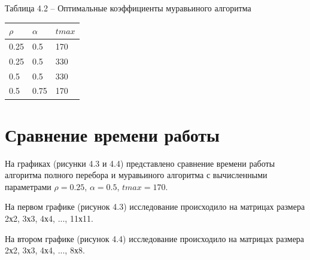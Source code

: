 \documentclass[12pt]{report}
\begin{document}
\begin{center}
	Таблица 4.2 -- Оптимальные коэффициенты муравьиного алгоритма
\end{center}

\begin{center}
	\begin{table}[h!]
		\begin{center}
			\begin{tabular}{|l|l|l|}
				\hline
				$\rho$                        & $\alpha$ & $tmax$ \\ \hline
				\multicolumn{1}{|c|}{0.25} & 0.5   & 170  \\ \hline
				0.25                       & 0.5   & 330  \\ \hline
				0.5                        & 0.5   & 330  \\ \hline
				0.5                        & 0.75  & 170  \\ \hline
			\end{tabular}
		\end{center}
	\end{table}
	
\end{center}

\section{Сравнение времени работы}

\hfill

На графиках (рисунки 4.3 и 4.4) представлено сравнение времени работы алгоритма полного перебора и муравьиного алгоритма с вычисленными параметрами $\rho = 0.25$, $\alpha = 0.5$, $tmax = 170$. 

На первом графике (рисунок 4.3) исследование происходило на матрицах размера 2х2, 3х3, 4х4, ..., 11х11.

На втором графике (рисунок 4.4) исследование происходило на матрицах размера 2х2, 3х3, 4х4, ..., 8х8.
\end{document}
